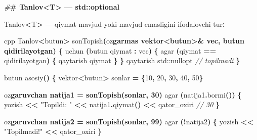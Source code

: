 \documentclass[a4paper,11pt,twoside,openright]{book}
\newenvironment{Shaded}{\begin{snugshade}}{\end{snugshade}}
\newcommand{\BuiltInTok}[1]{#1}
\newcommand{\CharTok}[1]{\textcolor[rgb]{0.31,0.60,0.02}{#1}}
\newcommand{\CommentTok}[1]{\textcolor[rgb]{0.56,0.35,0.01}{\textit{#1}}}
\newcommand{\DecValTok}[1]{\textcolor[rgb]{0.00,0.00,0.81}{#1}}
\newcommand{\ErrorTok}[1]{\textcolor[rgb]{0.64,0.00,0.00}{\textbf{#1}}}
\newcommand{\NormalTok}[1]{#1}
\newcommand{\OperatorTok}[1]{\textcolor[rgb]{0.81,0.36,0.00}{\textbf{#1}}}
\newcommand{\PreprocessorTok}[1]{\textcolor[rgb]{0.56,0.35,0.01}{\textit{#1}}}
\newcommand{\StringTok}[1]{\textcolor[rgb]{0.31,0.60,0.02}{#1}}
\begin{document}
\begin{Shaded}
\begin{Highlighting}[]
\PreprocessorTok{\#}\ErrorTok{\# \textasciigrave{}Tanlov\textless{}T\textgreater{}\textasciigrave{} — std::optional}

\ErrorTok{\textasciigrave{}}\NormalTok{Tanlov}\OperatorTok{\textless{}}\NormalTok{T}\OperatorTok{\textgreater{}}\ErrorTok{\textasciigrave{}}\NormalTok{ — qiymat mavjud yoki mavjud emasligini ifodalovchi tur}\OperatorTok{:}

\ErrorTok{\textasciigrave{}\textasciigrave{}\textasciigrave{}}\NormalTok{cpp}
\NormalTok{Tanlov}\OperatorTok{\textless{}}\NormalTok{butun}\OperatorTok{\textgreater{}}\NormalTok{ sonTopish}\OperatorTok{(}\NormalTok{o}\CharTok{\textquotesingle{}z}\ErrorTok{garmas vektor\textless{}butun\textgreater{}\& vec, butun qidirilayotgan) \{}
\NormalTok{    uchun }\OperatorTok{(}\NormalTok{butun qiymat }\OperatorTok{:}\NormalTok{ vec}\OperatorTok{)} \OperatorTok{\{}
\NormalTok{        agar }\OperatorTok{(}\NormalTok{qiymat }\OperatorTok{==}\NormalTok{ qidirilayotgan}\OperatorTok{)} \OperatorTok{\{}
\NormalTok{            qaytarish qiymat}
        \OperatorTok{\}}
    \OperatorTok{\}}
\NormalTok{    qaytarish }\BuiltInTok{std::}\NormalTok{nullopt   }\CommentTok{// topilmadi}
\OperatorTok{\}}

\NormalTok{butun asosiy}\OperatorTok{()} \OperatorTok{\{}
\NormalTok{    vektor}\OperatorTok{\textless{}}\NormalTok{butun}\OperatorTok{\textgreater{}}\NormalTok{ sonlar }\OperatorTok{=} \OperatorTok{\{}\DecValTok{10}\OperatorTok{,} \DecValTok{20}\OperatorTok{,} \DecValTok{30}\OperatorTok{,} \DecValTok{40}\OperatorTok{,} \DecValTok{50}\OperatorTok{\}}

\NormalTok{    o}\CharTok{\textquotesingle{}z}\ErrorTok{garuvchan natija1 = sonTopish(sonlar, 30)}
\NormalTok{    agar }\OperatorTok{(}\NormalTok{natija1}\OperatorTok{.}\NormalTok{bormi}\OperatorTok{())} \OperatorTok{\{}
\NormalTok{        yozish }\OperatorTok{\textless{}\textless{}} \StringTok{"Topildi: "} \OperatorTok{\textless{}\textless{}}\NormalTok{ natija1}\OperatorTok{.}\NormalTok{qiymat}\OperatorTok{()} \OperatorTok{\textless{}\textless{}}\NormalTok{ qator\_oxiri   }\CommentTok{// 30}
    \OperatorTok{\}}

\NormalTok{    o}\CharTok{\textquotesingle{}z}\ErrorTok{garuvchan natija2 = sonTopish(sonlar, 99)}
\NormalTok{    agar }\OperatorTok{(!}\NormalTok{natija2}\OperatorTok{)} \OperatorTok{\{}
\NormalTok{        yozish }\OperatorTok{\textless{}\textless{}} \StringTok{"Topilmadi!"} \OperatorTok{\textless{}\textless{}}\NormalTok{ qator\_oxiri}
    \OperatorTok{\}}


\end{Highlighting}
\end{Shaded}
\end{document}
